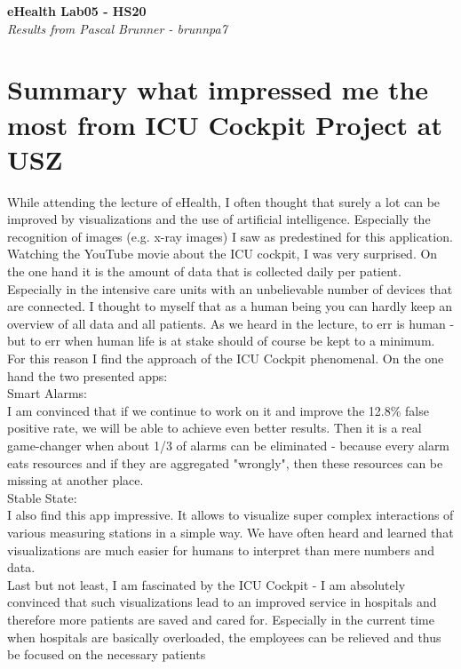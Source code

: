 \documentclass{report}
\newenvironment{Figure}
	{\par\medskip\noindent\minipage{\linewidth}}
	{\endminipage\par\medskip}
\begin{document}
\begin{titlepage}
   \begin{center}
      \Large\textbf{eHealth Lab05 - HS20}\\
      \large\textit{Results from Pascal Brunner - brunnpa7}
   \end{center}
\end{titlepage}


\section*{Summary what impressed me the most from ICU Cockpit Project at USZ}

While attending the lecture of eHealth, I often thought that surely a lot can be improved by visualizations and the use of artificial intelligence. Especially the recognition of images (e.g. x-ray images) I saw as predestined for this application. \\

Watching the YouTube movie about the ICU cockpit, I was very surprised. On the one hand it is the amount of data that is collected daily per patient. Especially in the intensive care units with an unbelievable number of devices that are connected. 
I thought to myself that as a human being you can hardly keep an overview of all data and all patients. As we heard in the lecture, to err is human - but to err when human life is at stake should of course be kept to a minimum. 
For this reason I find the approach of the ICU Cockpit phenomenal. On the one hand the two presented apps:\\
Smart Alarms:\\ 
I am convinced that if we continue to work on it and improve the 12.8\% false positive rate, we will be able to achieve even better results. Then it is a real game-changer when about 1/3 of alarms can be eliminated - 
because every alarm eats resources and if they are aggregated "wrongly", then these resources can be missing at another place.\\

Stable State:\\
I also find this app impressive. It allows to visualize super complex interactions of various measuring stations in a simple way. We have often heard and learned that visualizations are much easier for humans to interpret than mere numbers and data.\\

Last but not least, I am fascinated by the ICU Cockpit - I am absolutely convinced that such visualizations lead to an improved service in hospitals and therefore more patients are saved and cared for. 
Especially in the current time when hospitals are basically overloaded, the employees can be relieved and thus be focused on the necessary patients
\end{document}
